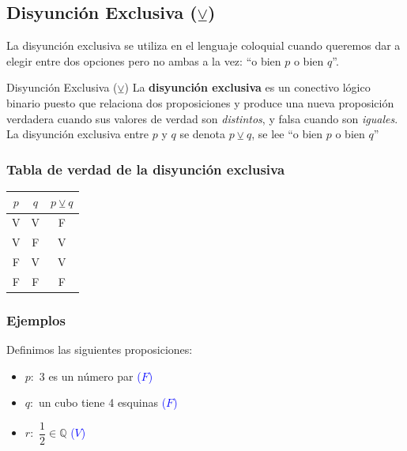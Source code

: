 \subsection{\texorpdfstring{Disyunción Exclusiva ($\veebar$)}{Disyuncion Exclusiva}}

\noindent La disyunción exclusiva se utiliza en el lenguaje coloquial cuando queremos dar a elegir entre dos opciones pero no ambas a la vez: ``o bien $p$ o bien $q$''.

\begin{dfn}{Disyunción Exclusiva ($\veebar$)}
    La \textbf{disyunción exclusiva} es un conectivo lógico binario puesto que relaciona dos proposiciones y produce una nueva proposición verdadera cuando sus valores de verdad son \emph{distintos}, y falsa cuando son \emph{iguales}. La disyunción exclusiva entre $p$ y $q$ se denota $p \veebar q$, se lee ``o bien $p$ o bien $q$''
\end{dfn}

\subsubsection*{Tabla de verdad de la disyunción exclusiva}
\begin{center}
    \renewcommand{\arraystretch}{1.4}
    \begin{tabular}{|c|c|c|}
        \hline
        \textbf{$p$} & \textbf{$q$} & \textbf{$p \veebar q$} \\
        \hline
        V & V & F \\
        \hline
        V & F & V \\
        \hline
        F & V & V \\
        \hline
        F & F & F \\
        \hline
    \end{tabular}
\end{center}

\subsubsection*{Ejemplos}

Definimos las siguientes proposiciones:
\begin{itemize}
    \item $p:$ 3 es un número par \textcolor{blue}{($F$)}
    \item $q:$ un cubo tiene 4 esquinas \textcolor{blue}{($F$)}
    \item $r:$ $\dfrac{1}{2} \in \mathbb{Q}$ \textcolor{blue}{($V$)}
\end{itemize}

